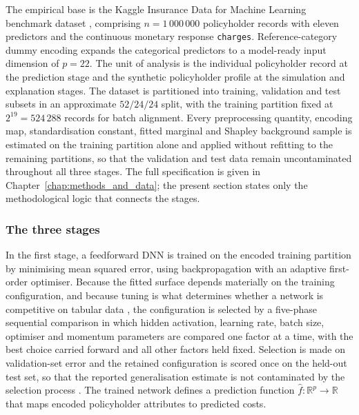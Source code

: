 The empirical base is the Kaggle Insurance Data for Machine Learning
benchmark dataset \citep{kaggleInsuranceDataML}, comprising
$n = 1\,000\,000$ policyholder records with eleven predictors and the
continuous monetary response \texttt{charges}.  Reference-category dummy
encoding expands the categorical predictors to a model-ready input
dimension of $p = 22$.  The unit of analysis is the individual
policyholder record at the prediction stage and the synthetic
policyholder profile at the simulation and explanation stages.  The
dataset is partitioned into training, validation and test subsets in an
approximate $52/24/24$ split, with the training partition fixed at
$2^{19} = 524\,288$ records for batch alignment.  Every preprocessing
quantity, encoding map, standardisation constant, fitted marginal and
Shapley background sample is estimated on the training partition alone
and applied without refitting to the remaining partitions, so that the
validation and test data remain uncontaminated throughout all three
stages.  The full specification is given in
Chapter~\ref{chap:methods_and_data}; the present section states only the
methodological logic that connects the stages.

\subsubsection{The three stages}
\label{sec:three_stages}

In the first stage, a feedforward DNN
\citep{goodfellow2016deep} is trained on the encoded training partition
by minimising mean squared error, using backpropagation with an adaptive
first-order optimiser.  Because the fitted surface depends materially on
the training configuration, and because tuning is what determines whether
a network is competitive on tabular data \citep{kadra2021welltuned}, the
configuration is selected by a five-phase sequential comparison in which
hidden activation, learning rate, batch size, optimiser and momentum
parameters are compared one factor at a time, with the best choice
carried forward and all other factors held fixed.  Selection is made on
validation-set error and the retained configuration is scored once on the
held-out test set, so that the reported generalisation estimate is not
contaminated by the selection process \citep{hastie2009elements}.  The
trained network defines a prediction function
$\hat{f}: \mathbb{R}^p \to \mathbb{R}$ that maps encoded policyholder
attributes to predicted costs.

